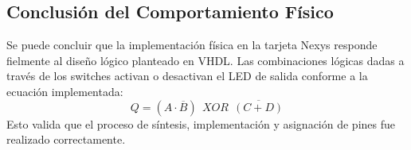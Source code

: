 \documentclass[a4paper,12pt]{article}
\begin{document}
\subsection*{Conclusión del Comportamiento Físico}

Se puede concluir que la implementación física en la tarjeta Nexys responde fielmente al diseño lógico planteado en VHDL. Las combinaciones lógicas dadas a través de los switches activan o desactivan el LED de salida conforme a la ecuación implementada:
\[
Q = (A \cdot \overline{B}) \ \ XOR \ \ \overline{(C + D)}
\]
Esto valida que el proceso de síntesis, implementación y asignación de pines fue realizado correctamente.
\end{document}
